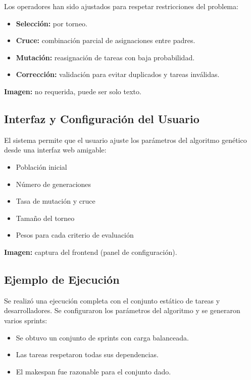 Los operadores han sido ajustados para respetar restricciones del problema:

\begin{itemize}
    \item \textbf{Selección:} por torneo.
    \item \textbf{Cruce:} combinación parcial de asignaciones entre padres.
    \item \textbf{Mutación:} reasignación de tareas con baja probabilidad.
    \item \textbf{Corrección:} validación para evitar duplicados y tareas inválidas.
\end{itemize}

\noindent\textbf{Imagen:} no requerida, puede ser solo texto.

\subsection{Interfaz y Configuración del Usuario}

El sistema permite que el usuario ajuste los parámetros del algoritmo genético desde una interfaz web amigable:

\begin{itemize}
    \item Población inicial
    \item Número de generaciones
    \item Tasa de mutación y cruce
    \item Tamaño del torneo
    \item Pesos para cada criterio de evaluación
\end{itemize}

\noindent\textbf{Imagen:} captura del frontend (panel de configuración).

\subsection{Ejemplo de Ejecución}

Se realizó una ejecución completa con el conjunto estático de tareas y desarrolladores. Se configuraron los parámetros del algoritmo y se generaron varios sprints:

\begin{itemize}
    \item Se obtuvo un conjunto de sprints con carga balanceada.
    \item Las tareas respetaron todas sus dependencias.
    \item El makespan fue razonable para el conjunto dado.
\end{itemize}

